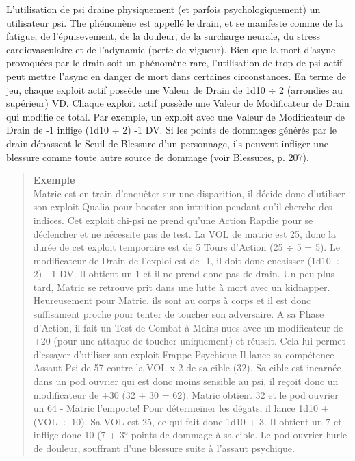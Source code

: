 L'utilisation de psi draine physiquement (et parfois psychologiquement)  un utilisateur psi. The phénomène est appellé le drain, et se manifeste comme de la fatigue, de l'épuisevement, de la douleur, de la surcharge neurale, du stress cardiovasculaire et de l'adynamie (perte de vigueur). Bien que la mort d'async provoquées par le drain soit un phénomène rare, l'utilisation de trop de psi actif peut mettre l'async en danger de mort dans certaines circonstances. En terme de jeu, chaque exploit actif possède une Valeur de Drain de 1d10 $\div$ 2 (arrondies au supérieur) VD. Chaque exploit actif possède une Valeur de Modificateur de Drain qui modifie ce total. Par exemple, un exploit avec une Valeur de Modificateur de Drain de -1 inflige (1d10 $\div$ 2) -1 DV. Si les points de dommages générés par le drain dépassent le Seuil de Blessure d'un personnage, ils peuvent infliger une blessure comme toute autre source de dommage (voir Blessures, p. 207). 

\begin{quotation} \textbf{Exemple} \\ Matric est en train d'enquêter sur une disparition, il décide donc d'utiliser son exploit Qualia pour booster son intuition pendant qu'il cherche des indices. Cet exploit chi-psi ne prend qu'une Action Rapdie pour se déclencher et ne nécessite pas de test. La VOL de matric est 25, donc la durée de cet exploit temporaire est de 5 Tours d'Action (25 $\div$ 5 = 5). Le modificateur de Drain de l'exploi est de -1, il doit donc encaisser (1d10 $\div$ 2) - 1 DV. Il obtient un 1 et il ne prend donc pas de drain. Un peu plus tard, Matric se retrouve prit dans une lutte à mort avec un kidnapper. Heureusement pour Matric, ils sont au corps à corps et il est donc suffisament proche pour tenter de toucher son adversaire. A sa Phase d'Action, il fait un Test de Combat à Mains nues avec un modificateur de +20 (pour une attaque de toucher uniquement) et réussit. Cela lui permet d'essayer d'utiliser son exploit Frappe Psychique Il lance sa compétence Assaut Psi de 57 contre la VOL x 2 de sa cible (32). Sa cible est incarnée dans un pod ouvrier qui est donc moins sensible au psi, il reçoit donc un modificateur de +30 (32 + 30 = 62). Matric obtient 32 et le pod ouvrier un 64 - Matric l'emporte! Pour détermeiner les dégats, il lance 1d10 + (VOL $\div$ 10). Sa VOL est 25, ce qui fait donc 1d10 + 3. Il obtient un 7 et inflige donc 10 (7 + 3° points de dommage à sa cible. Le pod ouvrier hurle de douleur, souffrant d'une blessure suite à l'assaut psychique. 

\end{quotation} 





